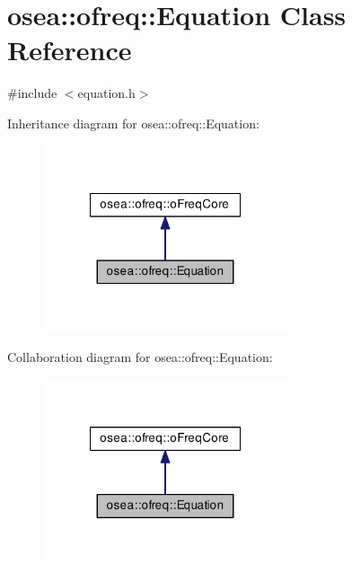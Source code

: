 \hypertarget{classosea_1_1ofreq_1_1_equation}{\section{osea\-:\-:ofreq\-:\-:Equation Class Reference}
\label{classosea_1_1ofreq_1_1_equation}
}


{\ttfamily \#include $<$equation.\-h$>$}



Inheritance diagram for osea\-:\-:ofreq\-:\-:Equation\-:
\nopagebreak
\begin{figure}[H]
\begin{center}
\leavevmode
\includegraphics[width=204pt]{classosea_1_1ofreq_1_1_equation__inherit__graph}
\end{center}
\end{figure}


Collaboration diagram for osea\-:\-:ofreq\-:\-:Equation\-:
\nopagebreak
\begin{figure}[H]
\begin{center}
\leavevmode
\includegraphics[width=204pt]{classosea_1_1ofreq_1_1_equation__coll__graph}
\end{center}
\end{figure}
